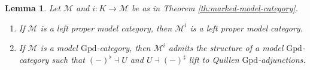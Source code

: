 \documentclass[a4paper]{article}
\newtheorem{lemma}[theorem]{Lemma}
\theoremstyle{remark}
\theoremstyle{definition}
\begin{document}
\begin{lemma}
  \label{lem:simplicial-marked-objects}
  Let $\mathcal{M}$ and $i : K \rightarrow \mathcal{M}$ be as in Theorem \ref{th:marked-model-category}.
  \begin{enumerate}[label={(\arabic*)}]
    \item
      \label{itm:marked-left-proper}
      If $\mathcal{M}$ is a left proper model category, then $\mathcal{M}^i$ is a left proper model category.
    \item
      \label{itm:marked-simplicial}
      If $\mathcal{M}$ is a model $\mathrm{Gpd}$-category, then $\mathcal{M}^i$ admits the structure of a model $\mathrm{Gpd}$-category such that $(-)^\flat \dashv U$ and $U \dashv (-)^\sharp$ lift to Quillen $\mathrm{Gpd}$-adjunctions.
  \end{enumerate}
\end{lemma}
\end{document}
